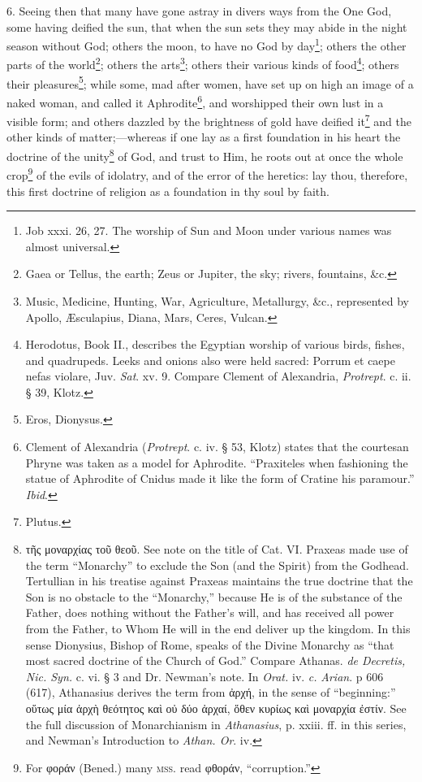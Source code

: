 6. Seeing then that many have gone astray in divers ways from the One God, some having deified the sun, that when the sun sets they may abide in the night season without God; others the moon, to have no God by day\footnote{Job xxxi. 26, 27. The worship of Sun and Moon under various names was almost universal.}; others the other parts of the world\footnote{Gaea or Tellus, the earth; Zeus or Jupiter, the sky; rivers, fountains, \&c.}; others the arts\footnote{Music, Medicine, Hunting, War, Agriculture, Metallurgy, \&c., represented by Apollo, Æsculapius, Diana, Mars, Ceres, Vulcan.}; others their various kinds of food\footnote{Herodotus, Book II., describes the Egyptian worship of various birds, fishes, and quadrupeds. Leeks and onions also were held sacred: Porrum et caepe nefas violare, Juv. \emph{Sat}. xv. 9. Compare Clement of Alexandria, \emph{Protrept}. c. ii. § 39, Klotz.}; others their pleasures\footnote{Eros, Dionysus.}; while some, mad after women, have set up on high an image of a naked woman, and called it Aphrodite\footnote{Clement of Alexandria (\emph{Protrept}. c. iv. § 53, Klotz) states that the courtesan Phryne was taken as a model for Aphrodite. “Praxiteles when fashioning the statue of Aphrodite of Cnidus made it like the form of Cratine his paramour.” \emph{Ibid}.}, and worshipped their own lust in a visible form; and others dazzled by the brightness of gold have deified it\footnote{Plutus.} and the other kinds of matter;—whereas if one lay as a first foundation in his heart the doctrine of the unity\footnote{\textgreek{τῆς μοναρχίας τοῦ θεοῦ}. See note on the title of Cat. VI. Praxeas made use of the term “Monarchy” to exclude the Son (and the Spirit) from the Godhead. Tertullian in his treatise against Praxeas maintains the true doctrine that the Son is no obstacle to the “Monarchy,” because He is of the substance of the Father, does nothing without the Father’s will, and has received all power from the Father, to Whom He will in the end deliver up the kingdom. In this sense Dionysius, Bishop of Rome, speaks of the Divine Monarchy as “that most sacred doctrine of the Church of God.” Compare Athanas. \emph{de Decretis, Nic. Syn.} c. vi. § 3 and Dr. Newman’s note. In \emph{Orat.} iv. \emph{c.} \emph{Arian}. p 606 (617), Athanasius derives the term from \textgreek{ἀρχή}, in the sense of “beginning:” \textgreek{οὕτως μία ἀρχὴ θεότητος καὶ οὐ δύο ἀρχαί, ὅθεν κυρίως καὶ μοναρχία ἐστίν}. See the full discussion of Monarchianism in \emph{Athanasius}, p. xxiii. ff. in this series, and Newman’s Introduction to \emph{Athan. Or}. iv.} of God, and trust to Him, he roots out at once the whole crop\footnote{For \textgreek{φοράν} (Bened.) many \textsc{mss.} read \textgreek{φθοράν}, “corruption.”} of the evils of idolatry, and of the error of the heretics: lay thou, therefore, this first doctrine of religion as a foundation in thy soul by faith.

